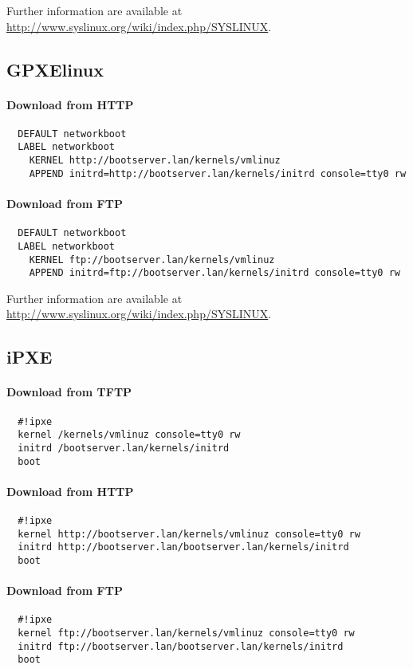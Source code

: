 \documentclass[a4paper,11pt]{article}
\begin{document}
Further information are available at \url{http://www.syslinux.org/wiki/index.php/SYSLINUX}.

\subsection{GPXElinux}
\paragraph{Download from HTTP}
\begin{verbatim}
  DEFAULT networkboot
  LABEL networkboot
    KERNEL http://bootserver.lan/kernels/vmlinuz
    APPEND initrd=http://bootserver.lan/kernels/initrd console=tty0 rw
\end{verbatim}

\paragraph{Download from FTP}
\begin{verbatim}
  DEFAULT networkboot
  LABEL networkboot
    KERNEL ftp://bootserver.lan/kernels/vmlinuz
    APPEND initrd=ftp://bootserver.lan/kernels/initrd console=tty0 rw
\end{verbatim}
\hrulefill

Further information are available at \url{http://www.syslinux.org/wiki/index.php/SYSLINUX}.

\subsection{iPXE}
\paragraph{Download from TFTP}
\begin{verbatim}
  #!ipxe
  kernel /kernels/vmlinuz console=tty0 rw
  initrd /bootserver.lan/kernels/initrd
  boot
\end{verbatim}

\paragraph{Download from HTTP}
\begin{verbatim}
  #!ipxe
  kernel http://bootserver.lan/kernels/vmlinuz console=tty0 rw
  initrd http://bootserver.lan/bootserver.lan/kernels/initrd
  boot
\end{verbatim}

\paragraph{Download from FTP}
\begin{verbatim}
  #!ipxe
  kernel ftp://bootserver.lan/kernels/vmlinuz console=tty0 rw
  initrd ftp://bootserver.lan/bootserver.lan/kernels/initrd
  boot
\end{verbatim}
\end{document}
